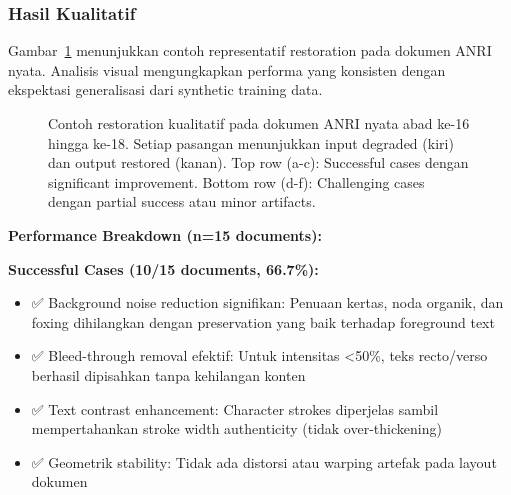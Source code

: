 \subsubsection{Hasil Kualitatif}

Gambar~\ref{fig:anri_qualitative} menunjukkan contoh representatif restoration pada dokumen ANRI nyata. Analisis visual mengungkapkan performa yang konsisten dengan ekspektasi generalisasi dari synthetic training data.

\begin{figure}[!t]
\centering
\caption{Contoh restoration kualitatif pada dokumen ANRI nyata abad ke-16 hingga ke-18. Setiap pasangan menunjukkan input degraded (kiri) dan output restored (kanan). Top row (a-c): Successful cases dengan significant improvement. Bottom row (d-f): Challenging cases dengan partial success atau minor artifacts.}
\label{fig:anri_qualitative}
\end{figure}

\textbf{Performance Breakdown (n=15 documents):}

\textbf{Successful Cases (10/15 documents, 66.7\%):}
\begin{itemize}
    \item ✅ Background noise reduction signifikan: Penuaan kertas, noda organik, dan foxing dihilangkan dengan preservation yang baik terhadap foreground text
    \item ✅ Bleed-through removal efektif: Untuk intensitas <50\%, teks recto/verso berhasil dipisahkan tanpa kehilangan konten
    \item ✅ Text contrast enhancement: Character strokes diperjelas sambil mempertahankan stroke width authenticity (tidak over-thickening)
    \item ✅ Geometrik stability: Tidak ada distorsi atau warping artefak pada layout dokumen
\end{itemize}

